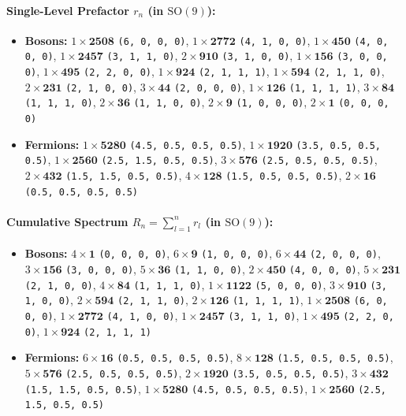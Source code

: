 \documentclass[11pt,a4paper]{article}
\begin{document}
\paragraph{Single-Level Prefactor $r_n$ (in $\mathrm{SO}(9)$):}
\begin{itemize}
    \item \textbf{Bosons:} $1 \times \mathbf{2508}$ \texttt{(6, 0, 0, 0)}, $1 \times \mathbf{2772}$ \texttt{(4, 1, 0, 0)}, $1 \times \mathbf{450}$ \texttt{(4, 0, 0, 0)}, $1 \times \mathbf{2457}$ \texttt{(3, 1, 1, 0)}, $2 \times \mathbf{910}$ \texttt{(3, 1, 0, 0)}, $1 \times \mathbf{156}$ \texttt{(3, 0, 0, 0)}, $1 \times \mathbf{495}$ \texttt{(2, 2, 0, 0)}, $1 \times \mathbf{924}$ \texttt{(2, 1, 1, 1)}, $1 \times \mathbf{594}$ \texttt{(2, 1, 1, 0)}, $2 \times \mathbf{231}$ \texttt{(2, 1, 0, 0)}, $3 \times \mathbf{44}$ \texttt{(2, 0, 0, 0)}, $1 \times \mathbf{126}$ \texttt{(1, 1, 1, 1)}, $3 \times \mathbf{84}$ \texttt{(1, 1, 1, 0)}, $2 \times \mathbf{36}$ \texttt{(1, 1, 0, 0)}, $2 \times \mathbf{9}$ \texttt{(1, 0, 0, 0)}, $2 \times \mathbf{1}$ \texttt{(0, 0, 0, 0)}
    \item \textbf{Fermions:} $1 \times \mathbf{5280}$ \texttt{(4.5, 0.5, 0.5, 0.5)}, $1 \times \mathbf{1920}$ \texttt{(3.5, 0.5, 0.5, 0.5)}, $1 \times \mathbf{2560}$ \texttt{(2.5, 1.5, 0.5, 0.5)}, $3 \times \mathbf{576}$ \texttt{(2.5, 0.5, 0.5, 0.5)}, $2 \times \mathbf{432}$ \texttt{(1.5, 1.5, 0.5, 0.5)}, $4 \times \mathbf{128}$ \texttt{(1.5, 0.5, 0.5, 0.5)}, $2 \times \mathbf{16}$ \texttt{(0.5, 0.5, 0.5, 0.5)}
\end{itemize}
\paragraph{Cumulative Spectrum $R_n = \sum_{l=1}^n r_l$ (in $\mathrm{SO}(9)$):}
\begin{itemize}
    \item \textbf{Bosons:} $4 \times \mathbf{1}$ \texttt{(0, 0, 0, 0)}, $6 \times \mathbf{9}$ \texttt{(1, 0, 0, 0)}, $6 \times \mathbf{44}$ \texttt{(2, 0, 0, 0)}, $3 \times \mathbf{156}$ \texttt{(3, 0, 0, 0)}, $5 \times \mathbf{36}$ \texttt{(1, 1, 0, 0)}, $2 \times \mathbf{450}$ \texttt{(4, 0, 0, 0)}, $5 \times \mathbf{231}$ \texttt{(2, 1, 0, 0)}, $4 \times \mathbf{84}$ \texttt{(1, 1, 1, 0)}, $1 \times \mathbf{1122}$ \texttt{(5, 0, 0, 0)}, $3 \times \mathbf{910}$ \texttt{(3, 1, 0, 0)}, $2 \times \mathbf{594}$ \texttt{(2, 1, 1, 0)}, $2 \times \mathbf{126}$ \texttt{(1, 1, 1, 1)}, $1 \times \mathbf{2508}$ \texttt{(6, 0, 0, 0)}, $1 \times \mathbf{2772}$ \texttt{(4, 1, 0, 0)}, $1 \times \mathbf{2457}$ \texttt{(3, 1, 1, 0)}, $1 \times \mathbf{495}$ \texttt{(2, 2, 0, 0)}, $1 \times \mathbf{924}$ \texttt{(2, 1, 1, 1)}
    \item \textbf{Fermions:} $6 \times \mathbf{16}$ \texttt{(0.5, 0.5, 0.5, 0.5)}, $8 \times \mathbf{128}$ \texttt{(1.5, 0.5, 0.5, 0.5)}, $5 \times \mathbf{576}$ \texttt{(2.5, 0.5, 0.5, 0.5)}, $2 \times \mathbf{1920}$ \texttt{(3.5, 0.5, 0.5, 0.5)}, $3 \times \mathbf{432}$ \texttt{(1.5, 1.5, 0.5, 0.5)}, $1 \times \mathbf{5280}$ \texttt{(4.5, 0.5, 0.5, 0.5)}, $1 \times \mathbf{2560}$ \texttt{(2.5, 1.5, 0.5, 0.5)}
\end{itemize}
\end{document}
